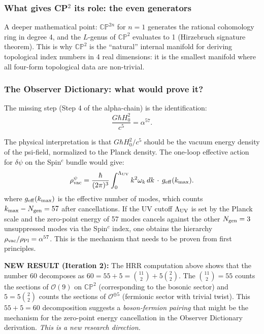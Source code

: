 \documentclass[11pt]{article}
\theoremstyle{definition}
\theoremstyle{remark}
\begin{document}
\subsubsection{What gives CP$^2$ its role: the even generators}

A deeper mathematical point: $\mathbb{CP}^{2n}$ for $n = 1$ generates the
rational cohomology ring in degree 4, and the $L$-genus of $\mathbb{CP}^2$
evaluates to 1 (Hirzebruch signature theorem). This is why $\mathbb{CP}^2$
is the ``natural'' internal manifold for deriving topological index numbers
in 4 real dimensions: it is the smallest manifold where all four-form
topological data are non-trivial.

\subsubsection{The Observer Dictionary: what would prove it?}

The missing step (Step 4 of the alpha-chain) is the identification:
\begin{equation}
\frac{G\hbar H_0^2}{c^5} = \alpha^{57}.
\end{equation}

The physical interpretation is that $G\hbar H_0^2/c^5$ should be the vacuum
energy density of the psi-field, normalized to the Planck density. The
one-loop effective action for $\delta\psi$ on the Spin$^c$ bundle would give:
\begin{equation}
\rho_{\rm vac}^{\psi} = \frac{\hbar}{(2\pi)^3}\int_0^{\Lambda_{\rm UV}}
k^2 \omega_k\,dk\,\cdot\,g_{\rm eff}(k_{\rm max}).
\end{equation}
where $g_{\rm eff}(k_{\rm max})$ is the effective number of modes, which
counts $k_{\rm max} - N_{\rm gen} = 57$ after cancellations. If the UV
cutoff $\Lambda_{\rm UV}$ is set by the Planck scale and the zero-point
energy of 57 modes cancels against the other $N_{\rm gen} = 3$
unsuppressed modes via the Spin$^c$ index, one obtains the hierarchy
$\rho_{\rm vac}/\rho_{\rm Pl} = \alpha^{57}$. This is the mechanism that
needs to be proven from first principles.

\textbf{NEW RESULT (Iteration 2):} The HRR computation above shows that the
number 60 decomposes as $60 = 55 + 5 = \binom{11}{2} + 5\binom{2}{2}$.
The $\binom{11}{2} = 55$ counts the sections of $\mathcal{O}(9)$ on $\mathbb{CP}^2$
(corresponding to the bosonic sector) and $5 = 5\binom{2}{2}$ counts the
sections of $\mathcal{O}^{\oplus 5}$ (fermionic sector with trivial twist).
This $55 + 5 = 60$ decomposition suggests a \emph{boson-fermion pairing}
that might be the mechanism for the zero-point energy cancellation
in the Observer Dictionary derivation. \emph{This is a new research direction.}
\end{document}
